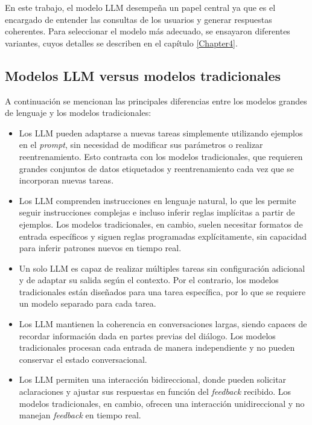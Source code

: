 En este trabajo, el modelo LLM desempeña un papel central ya que es el encargado de entender las consultas de 
los usuarios y generar respuestas coherentes. Para seleccionar el modelo más adecuado, 
se ensayaron diferentes variantes, cuyos detalles se describen en el capítulo \ref{Chapter4}.

\subsection{Modelos LLM versus modelos tradicionales}

A continuación se mencionan las principales diferencias entre los modelos grandes de lenguaje y los
modelos tradicionales:

\begin{itemize}
	\item Los LLM pueden adaptarse a nuevas tareas simplemente utilizando ejemplos en el \textit{prompt}, 
	sin necesidad de modificar sus parámetros o realizar reentrenamiento. Esto contrasta con los modelos tradicionales, 
	que requieren grandes conjuntos de datos etiquetados y reentrenamiento cada vez que se incorporan nuevas tareas.
	\item Los LLM comprenden instrucciones en lenguaje natural, lo que les permite seguir instrucciones complejas e 
	incluso inferir reglas implícitas a partir de ejemplos. Los modelos tradicionales, en cambio, suelen necesitar 
	formatos de entrada específicos y siguen reglas programadas explícitamente, sin capacidad para inferir patrones 
	nuevos en tiempo real.
	\item Un solo LLM es capaz de realizar múltiples tareas sin configuración adicional y de adaptar su salida según 
	el contexto. Por el contrario, los modelos tradicionales están diseñados para una tarea específica, por lo que 
	se requiere un modelo separado para cada tarea.
	\item Los LLM mantienen la coherencia en conversaciones largas, siendo capaces de recordar información dada en 
	partes previas del diálogo. Los modelos tradicionales procesan cada entrada de manera independiente y no pueden 
	conservar el estado conversacional.
	\item Los LLM permiten una interacción bidireccional, donde pueden solicitar aclaraciones y ajustar sus respuestas 
	en función del \textit{feedback} recibido. Los modelos tradicionales, en cambio, ofrecen una interacción unidireccional
	y no manejan \textit{feedback} en tiempo real.
\end{itemize}

